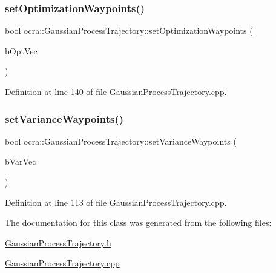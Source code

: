 \subsubsection{\texorpdfstring{set\+Optimization\+Waypoints()}{setOptimizationWaypoints()}}
{\footnotesize\ttfamily bool ocra\+::\+Gaussian\+Process\+Trajectory\+::set\+Optimization\+Waypoints (\begin{DoxyParamCaption}\item[{\hyperlink{namespaceocra_afaf4559cfedb560f8d1fe9bf6a21678f}{bool\+Vector} \&}]{b\+Opt\+Vec }\end{DoxyParamCaption})}



Definition at line 140 of file Gaussian\+Process\+Trajectory.\+cpp.

\hypertarget{classocra_1_1GaussianProcessTrajectory_ae41d4aadfdc7cf0da1cb5e141fdaad96}{}\label{classocra_1_1GaussianProcessTrajectory_ae41d4aadfdc7cf0da1cb5e141fdaad96} 
\subsubsection{\texorpdfstring{set\+Variance\+Waypoints()}{setVarianceWaypoints()}}
{\footnotesize\ttfamily bool ocra\+::\+Gaussian\+Process\+Trajectory\+::set\+Variance\+Waypoints (\begin{DoxyParamCaption}\item[{\hyperlink{namespaceocra_afaf4559cfedb560f8d1fe9bf6a21678f}{bool\+Vector} \&}]{b\+Var\+Vec }\end{DoxyParamCaption})}



Definition at line 113 of file Gaussian\+Process\+Trajectory.\+cpp.



The documentation for this class was generated from the following files\+:\begin{DoxyCompactItemize}
\item 
\hyperlink{GaussianProcessTrajectory_8h}{Gaussian\+Process\+Trajectory.\+h}\item 
\hyperlink{GaussianProcessTrajectory_8cpp}{Gaussian\+Process\+Trajectory.\+cpp}\end{DoxyCompactItemize}
